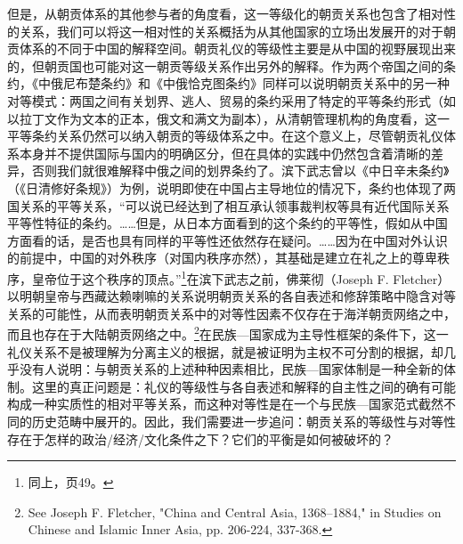 \documentclass[a4paper, 12pt, openright]{ctexbook}
\begin{document}
但是，从朝贡体系的其他参与者的角度看，这一等级化的朝贡关系也包含了相对性的关系，我们可以将这一相对性的关系概括为从其他国家的立场出发展开的对于朝贡体系的不同于中国的解释空间。朝贡礼仪的等级性主要是从中国的视野展现出来的，但朝贡国也可能对这一朝贡等级关系作出另外的解释。作为两个帝国之间的条约，《中俄尼布楚条约》和《中俄恰克图条约》同样可以说明朝贡关系中的另一种对等模式：两国之间有关划界、逃人、贸易的条约采用了特定的平等条约形式（如以拉丁文作为文本的正本，俄文和满文为副本），从清朝管理机构的角度看，这一平等条约关系仍然可以纳入朝贡的等级体系之中。在这个意义上，尽管朝贡礼仪体系本身并不提供国际与国内的明确区分，但在具体的实践中仍然包含着清晰的差异，否则我们就很难解释中俄之间的划界条约了。滨下武志曾以《中日辛未条约》（《日清修好条规》）为例，说明即使在中国占主导地位的情况下，条约也体现了两国关系的平等关系，“可以说已经达到了相互承认领事裁判权等具有近代国际关系平等性特征的条约。……但是，从日本方面看到的这个条约的平等性，假如从中国方面看的话，是否也具有同样的平等性还依然存在疑问。……因为在中国对外认识的前提中，中国的对外秩序（对国内秩序亦然），其基础是建立在礼之上的尊卑秩序，皇帝位于这个秩序的顶点。”\footnote{同上，页49。}在滨下武志之前，佛莱彻（Joseph F. Fletcher）以明朝皇帝与西藏达赖喇嘛的关系说明朝贡关系的各自表述和修辞策略中隐含对等关系的可能性，从而表明朝贡关系中的对等性因素不仅存在于海洋朝贡网络之中，而且也存在于大陆朝贡网络之中。\footnote{See Joseph F. Fletcher, "China and Central Asia, 1368--1884," in Studies on Chinese and Islamic Inner Asia, pp. 206-224, 337-368.}在民族—国家成为主导性框架的条件下，这一礼仪关系不是被理解为分离主义的根据，就是被证明为主权不可分割的根据，却几乎没有人说明：与朝贡关系的上述种种因素相比，民族—国家体制是一种全新的体制。这里的真正问题是：礼仪的等级性与各自表述和解释的自主性之间的确有可能构成一种实质性的相对平等关系，而这种对等性是在一个与民族—国家范式截然不同的历史范畴中展开的。因此，我们需要进一步追问：朝贡关系的等级性与对等性存在于怎样的政治/经济/文化条件之下？它们的平衡是如何被破坏的？
\end{document}
